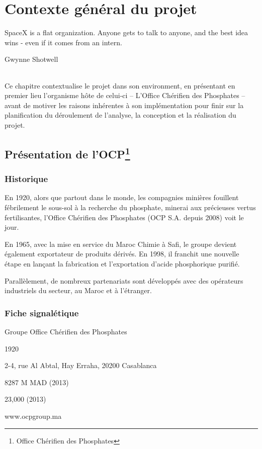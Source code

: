 \chapter{Contexte général du projet}
\epigraph{SpaceX is a flat organization. Anyone gets to talk to anyone, and the best idea wins - even if it comes from an intern.}{Gwynne Shotwell}	
\subparagraph{}
Ce chapitre contextualise le projet dans son environment, en présentant en premier lieu l'organisme hôte de celui-ci – L'Office Chérifien des Phosphates – avant de motiver les raisons inhérentes à son implémentation pour finir sur la planification du déroulement de l'analyse, la conception et la réalisation du projet.
\cleardoublepage

\section{Présentation de l’OCP\protect\footnote{Office Chérifien des Phosphates}}
	\subsection{Historique}
	En 1920, alors que partout dans le monde, les compagnies minières fouillent fébrilement le
sous-sol à la recherche du phosphate, minerai aux précieuses vertus fertilisantes, l’Office
Chérifien des Phosphates (OCP S.A. depuis 2008) voit le jour.

En 1965, avec la mise en service du Maroc Chimie à Safi, le groupe devient également
exportateur de produits dérivés. En 1998, il franchit une nouvelle étape en lançant la fabrication
et l’exportation d’acide phosphorique purifié.

Parallèlement, de nombreux partenariats sont développés avec des opérateurs industriels du
secteur, au Maroc et à l’étranger.
	\subsection{Fiche signalétique}
	\begin{description}[align=left]
		\item [Nomination sociale :] Groupe Office Chérifien des Phosphates
		\item [Date de création :] 1920
		\item [Siège social :] 2-4, rue Al Abtal, Hay Erraha, 20200 Casablanca
		\item [Capital social :] 8287 M MAD (2013)
		\item [Effectif employé :] 23,000 (2013)
		\item [Site web :] www.ocpgroup.ma
	\end{description}
